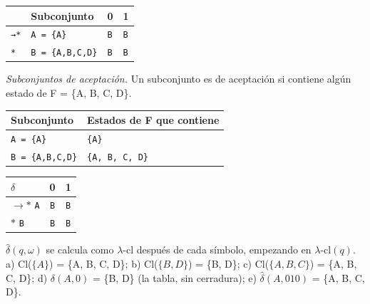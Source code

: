 \documentclass[11pt]{article}
\begin{document}
\begin{center}\footnotesize\begin{tabular}{llll}\toprule
 & Subconjunto & 0 & 1 \\\midrule
\texttt{→*} & \texttt{A = \{A\}} & \texttt{B} & \texttt{B} \\
\texttt{*} & \texttt{B = \{A,B,C,D\}} & \texttt{B} & \texttt{B} \\
\bottomrule\end{tabular}\end{center}
\textit{Subconjuntos de aceptación.} Un subconjunto es de aceptación si contiene algún estado de F = \{A, B, C, D\}.
\begin{center}\footnotesize\begin{tabular}{ll}\toprule
Subconjunto & Estados de F que contiene \\\midrule
\texttt{A = \{A\}} & \texttt{\{A\}} \\
\texttt{B = \{A,B,C,D\}} & \texttt{\{A, B, C, D\}} \\
\bottomrule\end{tabular}\end{center}
\begin{center}\small\begin{tabular}{lcc}\toprule
$\delta$ & 0 & 1 \\\midrule
$\to$$*$ \texttt{A} & \texttt{B} & \texttt{B} \\
$*$ \texttt{B} & \texttt{B} & \texttt{B} \\
\bottomrule\end{tabular}\end{center}
$\hat\delta(q, \omega)$ se calcula como $\lambda$-cl después de cada símbolo, empezando en $\lambda$-cl$(q)$.
\resp a) Cl($\{A\}$) = \{A, B, C, D\}; b) Cl($\{B, D\}$) = \{B, D\}; c) Cl($\{A, B, C\}$) = \{A, B, C, D\}; d) $\delta(A, 0)$ = \{B, D\} (la tabla, sin cerradura); e) $\hat\delta(A, 010)$ = \{A, B, C, D\}.
\end{document}
